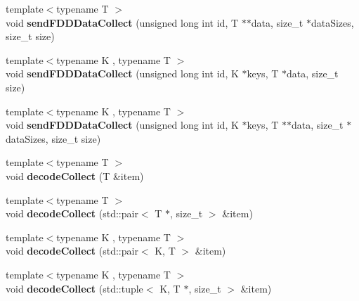 \begin{DoxyCompactItemize}
\item 
\hypertarget{classfaster_1_1fastComm_acba48eca1ae4a1934dfdd80652c98cf6}{}{\footnotesize template$<$typename T $>$ }\\void {\bfseries send\+F\+D\+D\+Data\+Collect} (unsigned long int id, T $\ast$$\ast$data, size\+\_\+t $\ast$data\+Sizes, size\+\_\+t size)\label{classfaster_1_1fastComm_acba48eca1ae4a1934dfdd80652c98cf6}

\item 
\hypertarget{classfaster_1_1fastComm_ad2e48d9672f566a92d8dcb4222682883}{}{\footnotesize template$<$typename K , typename T $>$ }\\void {\bfseries send\+F\+D\+D\+Data\+Collect} (unsigned long int id, K $\ast$keys, T $\ast$data, size\+\_\+t size)\label{classfaster_1_1fastComm_ad2e48d9672f566a92d8dcb4222682883}

\item 
\hypertarget{classfaster_1_1fastComm_a563c5313ec49a2922ea25dc851e75071}{}{\footnotesize template$<$typename K , typename T $>$ }\\void {\bfseries send\+F\+D\+D\+Data\+Collect} (unsigned long int id, K $\ast$keys, T $\ast$$\ast$data, size\+\_\+t $\ast$data\+Sizes, size\+\_\+t size)\label{classfaster_1_1fastComm_a563c5313ec49a2922ea25dc851e75071}

\item 
\hypertarget{classfaster_1_1fastComm_abbd762b33b892abad86f8f041c4e8b9b}{}{\footnotesize template$<$typename T $>$ }\\void {\bfseries decode\+Collect} (T \&item)\label{classfaster_1_1fastComm_abbd762b33b892abad86f8f041c4e8b9b}

\item 
\hypertarget{classfaster_1_1fastComm_a9ee260039066dc7cd1f89883cf79dd57}{}{\footnotesize template$<$typename T $>$ }\\void {\bfseries decode\+Collect} (std\+::pair$<$ T $\ast$, size\+\_\+t $>$ \&item)\label{classfaster_1_1fastComm_a9ee260039066dc7cd1f89883cf79dd57}

\item 
\hypertarget{classfaster_1_1fastComm_acec19dd57de4e3a802a665712afd671b}{}{\footnotesize template$<$typename K , typename T $>$ }\\void {\bfseries decode\+Collect} (std\+::pair$<$ K, T $>$ \&item)\label{classfaster_1_1fastComm_acec19dd57de4e3a802a665712afd671b}

\item 
\hypertarget{classfaster_1_1fastComm_a3a5241970fed0e747bdbcdd3a78981d5}{}{\footnotesize template$<$typename K , typename T $>$ }\\void {\bfseries decode\+Collect} (std\+::tuple$<$ K, T $\ast$, size\+\_\+t $>$ \&item)\label{classfaster_1_1fastComm_a3a5241970fed0e747bdbcdd3a78981d5}


\end{DoxyCompactItemize}
